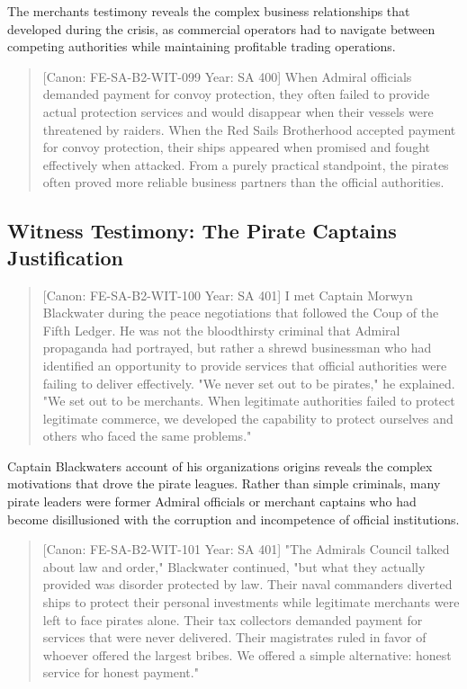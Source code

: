 The merchant\textquotesingle s testimony reveals the complex business
relationships that developed during the crisis, as commercial operators
had to navigate between competing authorities while maintaining
profitable trading operations.

\begin{quote}
{[}Canon: FE-SA-B2-WIT-099 \textbar{} Year: SA 400{]} When Admiral
officials demanded payment for convoy protection, they often failed to
provide actual protection services and would disappear when their
vessels were threatened by raiders. When the Red Sails Brotherhood
accepted payment for convoy protection, their ships appeared when
promised and fought effectively when attacked. From a purely practical
standpoint, the pirates often proved more reliable business partners
than the official authorities.
\end{quote}

\subsection{Witness Testimony: The Pirate Captain\textquotesingle s
Justification}\label{witness-testimony-the-pirate-captains-justification}

\begin{quote}
{[}Canon: FE-SA-B2-WIT-100 \textbar{} Year: SA 401{]} I met Captain
Morwyn Blackwater during the peace negotiations that followed the Coup
of the Fifth Ledger. He was not the bloodthirsty criminal that Admiral
propaganda had portrayed, but rather a shrewd businessman who had
identified an opportunity to provide services that official authorities
were failing to deliver effectively. "We never set out to be pirates,"
he explained. "We set out to be merchants. When legitimate authorities
failed to protect legitimate commerce, we developed the capability to
protect ourselves and others who faced the same problems."
\end{quote}

Captain Blackwater\textquotesingle s account of his
organization\textquotesingle s origins reveals the complex motivations
that drove the pirate leagues. Rather than simple criminals, many pirate
leaders were former Admiral officials or merchant captains who had
become disillusioned with the corruption and incompetence of official
institutions.

\begin{quote}
{[}Canon: FE-SA-B2-WIT-101 \textbar{} Year: SA 401{]} "The
Admiral\textquotesingle s Council talked about law and order,"
Blackwater continued, "but what they actually provided was disorder
protected by law. Their naval commanders diverted ships to protect their
personal investments while legitimate merchants were left to face
pirates alone. Their tax collectors demanded payment for services that
were never delivered. Their magistrates ruled in favor of whoever
offered the largest bribes. We offered a simple alternative: honest
service for honest payment."
\end{quote}

